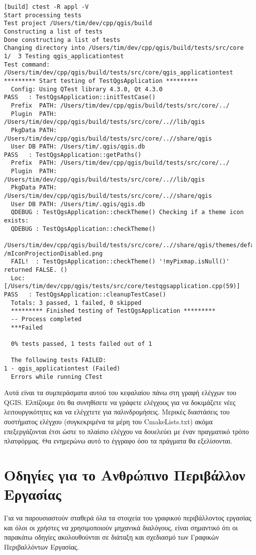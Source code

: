 \begin{verbatim}
[build] ctest -R appl -V
Start processing tests
Test project /Users/tim/dev/cpp/qgis/build
Constructing a list of tests
Done constructing a list of tests
Changing directory into /Users/tim/dev/cpp/qgis/build/tests/src/core
1/  3 Testing qgis_applicationtest          
Test command: /Users/tim/dev/cpp/qgis/build/tests/src/core/qgis_applicationtest
********* Start testing of TestQgsApplication *********
  Config: Using QTest library 4.3.0, Qt 4.3.0
PASS   : TestQgsApplication::initTestCase()
  Prefix  PATH: /Users/tim/dev/cpp/qgis/build/tests/src/core/../
  Plugin  PATH: /Users/tim/dev/cpp/qgis/build/tests/src/core/..//lib/qgis
  PkgData PATH: /Users/tim/dev/cpp/qgis/build/tests/src/core/..//share/qgis
  User DB PATH: /Users/tim/.qgis/qgis.db
PASS   : TestQgsApplication::getPaths()
  Prefix  PATH: /Users/tim/dev/cpp/qgis/build/tests/src/core/../
  Plugin  PATH: /Users/tim/dev/cpp/qgis/build/tests/src/core/..//lib/qgis
  PkgData PATH: /Users/tim/dev/cpp/qgis/build/tests/src/core/..//share/qgis
  User DB PATH: /Users/tim/.qgis/qgis.db
  QDEBUG : TestQgsApplication::checkTheme() Checking if a theme icon exists:
  QDEBUG : TestQgsApplication::checkTheme() 
  /Users/tim/dev/cpp/qgis/build/tests/src/core/..//share/qgis/themes/default/
/mIconProjectionDisabled.png
  FAIL!  : TestQgsApplication::checkTheme() '!myPixmap.isNull()' returned FALSE. ()
  Loc: [/Users/tim/dev/cpp/qgis/tests/src/core/testqgsapplication.cpp(59)]
PASS   : TestQgsApplication::cleanupTestCase()
  Totals: 3 passed, 1 failed, 0 skipped
  ********* Finished testing of TestQgsApplication *********
  -- Process completed
  ***Failed

  0% tests passed, 1 tests failed out of 1

  The following tests FAILED:
1 - qgis_applicationtest (Failed)
  Errors while running CTest
\end{verbatim}

Αυτά είναι τα συμπεράσματα αυτού του κεφαλαίου πάνω στη γραφή ελέγχων του QGIS. Ελπίζουμε ότι  θα συνηθίσετε να γράφετε ελέγχους για να δοκιμάζετε νέες λειτουργικότητες και να ελέγχτετε για παλινδρομήσεις. Μερικές διαστάσεις του συστήματος ελέγχου (συγκεκριμένα τα μέρη του CmakeLists.txt) ακόμα επεξεργάζονται έτσι ώστε το πλαίσιο ελέγχου να δουελεύει με έναν πραγματικό τρόπο πλατφόρμας. Θα ενημερώνω αυτό το έγγραφο όσο τα πράγματα θα εξελίσονται.


\hypertarget{toc54}{}
\section{Οδηγίες για το Ανθρώπινο Περιβάλλον Εργασίας}
Για να παρουσιαστούν σταθερά όλα τα στοιχεία του γραφικού περιβάλλοντος εργασίας και όλοι οι χρήστες να χρησιμοποιούν μηχανικά διαλόγους, είναι σημαντικό ότι οι παρακάτω οδηγίες ακολουθούνται σε διάταξη και σχεδιασμό των Γραφικών Περιβαλλόντων Εργασίας.

